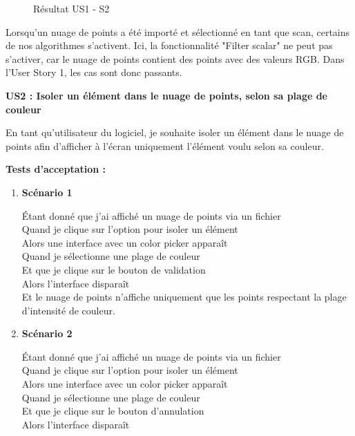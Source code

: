 \documentclass[12pt,titlepage,french]{article}
\begin{document}
\begin{figure}[H]
    \caption{\label{} Résultat US1 - S2}
\end{figure}

Lorsqu'un nuage de points a été importé et sélectionné en tant que scan, certains de nos algorithmes s'activent. Ici, la fonctionnalité "Filter scalar" ne peut pas s'activer, car le nuage de points contient des points avec des valeurs RGB. Dans l'User Story 1, les cas sont donc passants. \newline

\textbf{\og US2 : Isoler un élément dans le nuage de points, selon sa plage de couleur\fg{}}

En tant qu'utilisateur du logiciel, je souhaite isoler un élément dans le nuage de points afin d'afficher à l'écran uniquement l'élément voulu selon sa couleur.

\textbf{Tests d'acceptation :}
\begin{enumerate}

    \item \textbf{Scénario 1}

Étant donné que j'ai affiché un nuage de points via un fichier\\
Quand je clique sur l'option pour isoler un élément\\
Alors une interface avec un color picker apparaît\\
Quand je sélectionne une plage de couleur\\
Et que je clique sur le bouton de validation\\
Alors l'interface disparaît\\
Et le nuage de points n'affiche uniquement que les points respectant la plage d'intensité de couleur.

    \item \textbf{Scénario 2}

Étant donné que j'ai affiché un nuage de points via un fichier\\
Quand je clique sur l'option pour isoler un élément\\
Alors une interface avec un color picker apparaît\\
Quand je sélectionne une plage de couleur\\
Et que je clique sur le bouton d'annulation\\
Alors l'interface disparaît\\
\end{enumerate}
\end{document}
